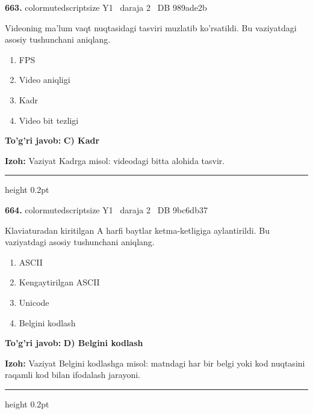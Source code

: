 \documentclass[10pt,a4paper,oneside]{article}
\begin{document}
\noindent\textbf{\color{ink}663.}  {color{muted}scriptsize Y1 \textbullet\ daraja 2 \textbullet\ DB 989ade2b}
\par
Videoning ma'lum vaqt nuqtasidagi tasviri muzlatib ko'rsatildi. Bu vaziyatdagi asosiy tushunchani aniqlang.
\begin{enumerate}[label=\Alph*),leftmargin=9mm]
\item FPS
\item Video aniqligi
\item Kadr
\item Video bit tezligi
\end{enumerate}
\begin{tcolorbox}[enhanced,breakable,colback=teal!4,colframe=teal!50!black,boxrule=0.5pt,arc=1.1mm,left=3mm,right=3mm,top=1.7mm,bottom=1.7mm,before skip=2mm,after skip=2mm]
\textbf{\color{teal}To'g'ri javob:} \textbf{C) Kadr}
\par\smallskip
\textbf{Izoh:} Vaziyat Kadrga misol: videodagi bitta alohida tasvir.
\end{tcolorbox}
\vspace{2mm}\hrule height 0.2pt \vspace{3mm}

\noindent\textbf{\color{ink}664.}  {color{muted}scriptsize Y1 \textbullet\ daraja 2 \textbullet\ DB 9bc6db37}
\par
Klaviaturadan kiritilgan A harfi baytlar ketma-ketligiga aylantirildi. Bu vaziyatdagi asosiy tushunchani aniqlang.
\begin{enumerate}[label=\Alph*),leftmargin=9mm]
\item ASCII
\item Kengaytirilgan ASCII
\item Unicode
\item Belgini kodlash
\end{enumerate}
\begin{tcolorbox}[enhanced,breakable,colback=teal!4,colframe=teal!50!black,boxrule=0.5pt,arc=1.1mm,left=3mm,right=3mm,top=1.7mm,bottom=1.7mm,before skip=2mm,after skip=2mm]
\textbf{\color{teal}To'g'ri javob:} \textbf{D) Belgini kodlash}
\par\smallskip
\textbf{Izoh:} Vaziyat Belgini kodlashga misol: matndagi har bir belgi yoki kod nuqtasini raqamli kod bilan ifodalash jarayoni.
\end{tcolorbox}
\vspace{2mm}\hrule height 0.2pt \vspace{3mm}
\end{document}
